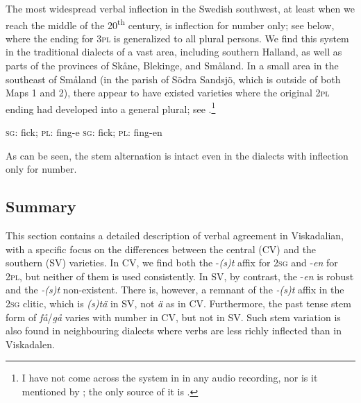 \documentclass[output=paper,colorlinks,citecolor=brown,draft,draftmode]{langscibook}
\begin{document}
The most widespread verbal inflection in the Swedish southwest, at least when we reach the middle of the 20\textsuperscript{th} century, is inflection for number only; see  below, where the ending for 3\textsc{pl} is generalized to all plural persons. We find this system in the traditional dialects of a vast area, including southern Halland, as well as parts of the provinces of Skåne, Blekinge, and Småland. In a small area in the southeast of Småland (in the parish of Södra Sandsjö, which is outside of both Maps 1 and 2), there appear to have existed varieties where the original 2\textsc{pl} ending had developed into a general plural; see .\footnote{I have not come across the system in  in any audio recording, nor is it mentioned by \citet{Horn2015,Horn2017}; the only source of it is \citet{Granstrom1915}.}


\ea\label{ex:petzell:24}
\ea\label{ex:petzell:24a}  \textsc{sg}:  \hspace{\tabcolsep}  {fick};  \hspace{2\tabcolsep}    \textsc{pl:} \hspace{\tabcolsep}  {fing-e}
\ex\label{ex:petzell:24b}  \textsc{sg}:  \hspace{\tabcolsep}  {fick};  \hspace{2\tabcolsep}    \textsc{pl:} \hspace{\tabcolsep}  {fing-en}
\z
\z


As can be seen, the stem alternation is intact even in the dialects with inflection only for number.


\subsection{Summary}\label{sec:petzell:3.3}


This section contains a detailed description of verbal agreement in Viskadalian, with a specific focus on the differences between the central (CV) and the southern (SV) varieties. In CV, we find both the -\textit{(s)t} affix for 2\textsc{sg} and -\textit{en} for 2\textsc{pl,} but neither of them is used consistently. In SV, by contrast, the -\textit{en} is robust and the \textit{-(s)t} non-existent. There is, however, a remnant of the \textit{-(s)t} affix in the 2\textsc{sg} clitic, which is \textit{(s)tä} in SV, not \textit{ä} as in CV. Furthermore, the past tense stem form of \textit{få}/\textit{gå} varies with number in CV, but not in SV. Such stem variation is also found in neighbouring dialects where verbs are less richly inflected than in Viskadalen.
\end{document}
